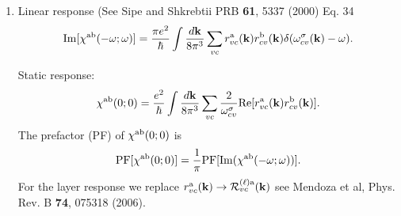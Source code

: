 \documentclass[12pt]{article}
\numberwithin{equation}{section}
\begin{document}
\begin{enumerate}

\item Linear response (See Sipe and Shkrebtii PRB {\bf 61}, 5337 (2000) Eq. 34
\begin{equation}\label{chif}
\mathrm{Im}[\chi^{\mathrm{a}\mathrm{b}}(-\omega;\omega)]
=\frac{\pi e^2}{\hbar}
\int \frac{d\mathbf{k}}{8\pi^3}
\sum_{vc} 
r^{\mathrm{a}}_{vc}(\mathbf{k})r^{\mathrm{b}}_{cv}(\mathbf{k})\delta(\omega^\sigma_{cv}(\mathbf{k})-\omega)  
.  
\end{equation}  

Static response:
\begin{equation*}\label{chif0}
\chi^{\mathrm{a}\mathrm{b}}(0;0)=\frac{e^2}{\hbar}
\int \frac{d\mathbf{k}}{8\pi^3}
\sum_{vc}\frac{2}{\omega^\sigma_{cv}}
\mathrm{Re}[r^{\mathrm{a}}_{vc}(\mathbf{k})r^{\mathrm{b}}_{cv}(\mathbf{k})]
. 
\end{equation*} 
The prefactor (PF) of $\chi^{\mathrm{a}\mathrm{b}}(0;0)$ is
\begin{align}\label{mcv1}
\mathrm{PF}[\chi^{\mathrm{a}\mathrm{b}}(0;0)]=\frac{1}{\pi}
\mathrm{PF[Im}(\chi^{\mathrm{a}\mathrm{b}}(-\omega;\omega))]
.
\end{align}
For the layer response we replace $r^{\mathrm{a}}_{vc}(\mathbf{k})\to{\cal 
 R}^{(\ell)\mathrm{a}}_{vc}(\mathbf{k})$ see Mendoza et al, Phys. Rev. B {\bf 74},
075318 (2006). 


\end{enumerate}
\end{document}
